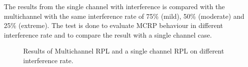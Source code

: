 The results from the single channel with interference is compared with the multichannel with the same interference rate of 75\% (mild), 50\% (moderate) and 25\% (extreme). The test is done to evaluate MCRP behaviour in different interference rate and to compare the result with a single channel case. 

\begin{figure}
\centering
{}                
\caption{Results of Multichannel RPL and a single channel RPL on different interference rate.}
\label{fig:sminterference}
\end{figure}


